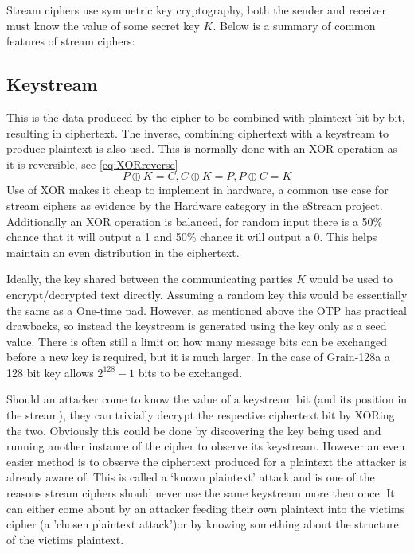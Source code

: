 \documentclass{report}
\let\Oldsubsection\subsection
\renewcommand{\subsection}{\FloatBarrier\Oldsubsection}
\begin{document}
Stream ciphers use symmetric key cryptography, both the sender and receiver must know the value of some secret key $K$.
\newpage
Below is a summary of common features of stream ciphers:
\subsection{Keystream}
This is the data produced by the cipher to be combined with plaintext bit by bit, resulting in ciphertext. The inverse, combining ciphertext with a keystream to produce plaintext is also used. This is normally done with an XOR operation as it is reversible, see \ref{eq:XORreverse}
\begin{equation}
P \oplus K=C, C \oplus K=P, P \oplus C = K
\label{eq:XORreverse}
\end{equation}
Use of XOR makes it cheap to implement in hardware, a common use case for stream ciphers as evidence by the Hardware category in the eStream project\cite{eStreamPort}. Additionally an XOR operation is balanced, for random input there is a 50\% chance that it will output a 1 and 50\% chance it will output a 0. This helps maintain an even distribution in the ciphertext.

Ideally, the key shared between the communicating parties $K$ would be used to encrypt/decrypted text directly. Assuming a random key this would be essentially the same as a One-time pad. However, as mentioned above the OTP has practical drawbacks, so instead the keystream is generated using the key only as a seed value. There is often still a limit on how many message bits can be exchanged before a new key is required, but it is much larger. In the case of Grain-128a a 128 bit key allows $2^{128}-1$ bits to be exchanged\cite{Grain128aSpec}.

Should an attacker come to know the value of a keystream bit (and its position in the stream), they can trivially decrypt the respective ciphertext bit by XORing the two. Obviously this could be done by discovering the key being used and running another instance of the cipher to observe its keystream. However an even easier method is to observe the ciphertext produced for a plaintext the attacker is already aware of. This is called a `known plaintext' attack\cite{plaintextAttack} and is one of the reasons stream ciphers should never use the same keystream more then once. It can either come about by an attacker feeding their own plaintext into the victims cipher (a 'chosen plaintext attack')or by knowing something about the structure of the victims plaintext.
\end{document}
